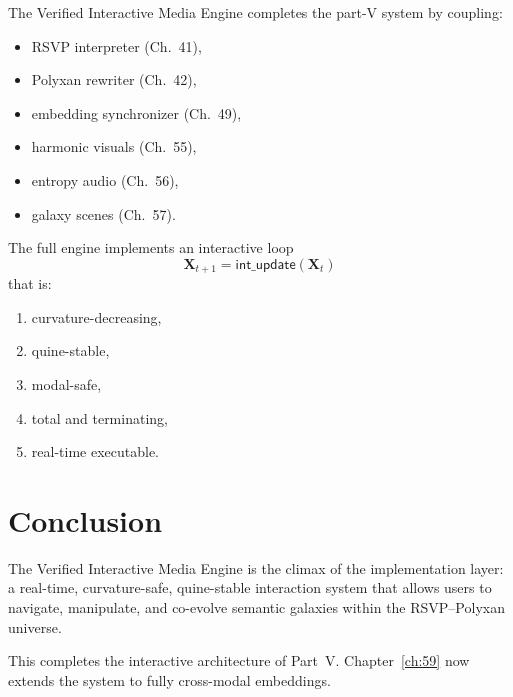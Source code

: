 The Verified Interactive Media Engine completes the part-V system by coupling:

\begin{itemize}
  \item RSVP interpreter (Ch.~41),
  \item Polyxan rewriter (Ch.~42),
  \item embedding synchronizer (Ch.~49),
  \item harmonic visuals (Ch.~55),
  \item entropy audio (Ch.~56),
  \item galaxy scenes (Ch.~57).
\end{itemize}

\begin{theorem}
The full engine implements an interactive loop
\[
\mathbf{X}_{t+1}
=
\mathsf{int\_update}(\mathbf{X}_t)
\]
that is:
\begin{enumerate}
  \item curvature-decreasing,
  \item quine-stable,
  \item modal-safe,
  \item total and terminating,
  \item real-time executable.
\end{enumerate}
\end{theorem}

\section{Conclusion}
\label{sec:58:conclusion}

The Verified Interactive Media Engine is the climax of the implementation 
layer: a real-time, curvature-safe, quine-stable interaction system that allows
users to navigate, manipulate, and co-evolve semantic galaxies within the 
RSVP--Polyxan universe.

This completes the interactive architecture of Part~V.  
Chapter~\ref{ch:59} now extends the system to fully cross-modal embeddings.

